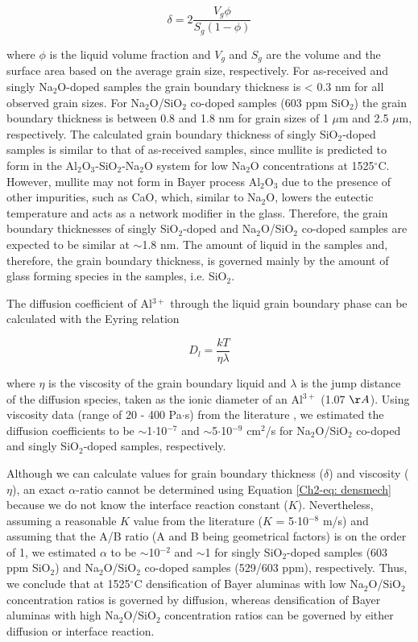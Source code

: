\begin{equation}
\label{Ch2-eq: gbthickness}
\delta = 2 \frac{V_{g} \phi}{S_{g} \left(1-\phi\right)}
\end{equation}

\noindent where $\phi$ is the liquid volume fraction and $V_{g}$ and $S_{g}$ are the volume and the surface area based on the average grain size, respectively. For as-received and singly Na$_{2}$O-doped samples the grain boundary thickness is < 0.3 nm for all observed grain sizes. For Na$_{2}$O/SiO$_{2}$ co-doped samples (603 ppm SiO$_{2}$) the grain boundary thickness is between 0.8 and 1.8 nm for grain sizes of 1 $\mu$m and 2.5 $\mu$m, respectively. The calculated grain boundary thickness of singly SiO$_{2}$-doped samples is similar to that of as-received samples, since mullite is predicted to form in the Al$_{2}$O$_{3}$-SiO$_{2}$-Na$_{2}$O system for low Na$_{2}$O concentrations at 1525$^{\circ}$C. However, mullite may not form in Bayer process Al$_{2}$O$_{3}$ due to the presence of other impurities, such as CaO, which, similar to Na$_{2}$O, lowers the eutectic temperature and acts as a network modifier in the glass. Therefore, the grain boundary thicknesses of singly SiO$_{2}$-doped and Na$_{2}$O/SiO$_{2}$ co-doped samples are expected to be similar at $\sim$1.8 nm. The amount of liquid in the samples and, therefore, the grain boundary thickness, is governed mainly by the amount of glass forming species in the samples, i.e. SiO$_{2}$.

The diffusion coefficient of Al$^{3+}$ through the liquid grain boundary phase can be calculated with the Eyring relation

\begin{equation}
\label{Ch2-eq: eyring}
D_{l} = \frac{kT}{\eta \lambda}
\end{equation}

\noindent where $\eta$ is the viscosity of the grain boundary liquid and $\lambda$ is the jump distance of the diffusion species, taken as the ionic diameter of an Al$^{3+}$ (1.07 $\AA$). Using viscosity data (range of 20 - 400 Pa$\cdot$s) from the literature \cite{Wu2015}, we estimated the diffusion coefficients to be $\sim$1$\cdot$10$^{-7}$ and $\sim$5$\cdot$10$^{-9}$ cm$^{2}$/s for Na$_{2}$O/SiO$_{2}$ co-doped and singly SiO$_{2}$-doped samples, respectively.

Although we can calculate values for grain boundary thickness ($\delta$) and viscosity ($\eta$), an exact $\alpha$-ratio cannot be determined using Equation \ref{Ch2-eq: densmech} because we do not know the interface reaction constant ($K$). Nevertheless, assuming a reasonable $K$ value from the literature ($K$ = 5$\cdot$10$^{-8}$ m/s) \cite{Kwon1991} and assuming that the A/B ratio (A and B being geometrical factors) is on the order of 1, we estimated $\alpha$ to be $\sim$10$^{-2}$ and $\sim$1 for singly SiO$_{2}$-doped samples (603 ppm SiO$_{2}$) and Na$_{2}$O/SiO$_{2}$ co-doped samples (529/603 ppm), respectively. Thus, we conclude that at 1525$^{\circ}$C densification of Bayer aluminas with low Na$_{2}$O/SiO$_{2}$ concentration ratios is governed by diffusion, whereas densification of Bayer aluminas with high Na$_{2}$O/SiO$_{2}$ concentration ratios can be governed by either diffusion or interface reaction. 

